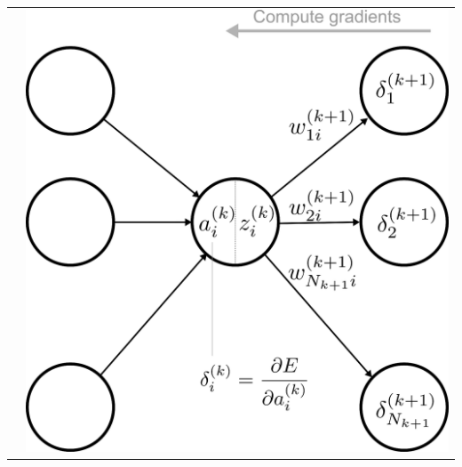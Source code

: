 \documentclass{article}
\begin{document}
\begin{table}[htb!]
\begin{tabular}{ll}
{} &
\parbox[b][0.4\textheight][t]{0.47\textwidth}{
\includegraphics[width=\linewidth]{./neural_networks_local_backpropagation.eps} }
\end{tabular}
\end{table}
\end{document}
